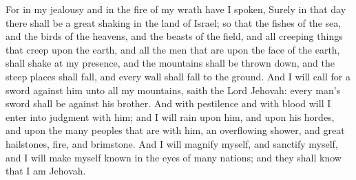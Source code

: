 For in my jealousy and in the fire of my wrath have I spoken, Surely in that day there shall be a great shaking in the land of Israel; so that the fishes of the sea, and the birds of the heavens, and the beasts of the field, and all creeping things that creep upon the earth, and all the men that are upon the face of the earth, shall shake at my presence, and the mountains shall be thrown down, and the steep places shall fall, and every wall shall fall to the ground. And I will call for a sword against him unto all my mountains, saith the Lord Jehovah: every man’s sword shall be against his brother. And with pestilence and with blood will I enter into judgment with him; and I will rain upon him, and upon his hordes, and upon the many peoples that are with him, an overflowing shower, and great hailstones, fire, and brimstone. And I will magnify myself, and sanctify myself, and I will make myself known in the eyes of many nations; and they shall know that I am Jehovah. 

